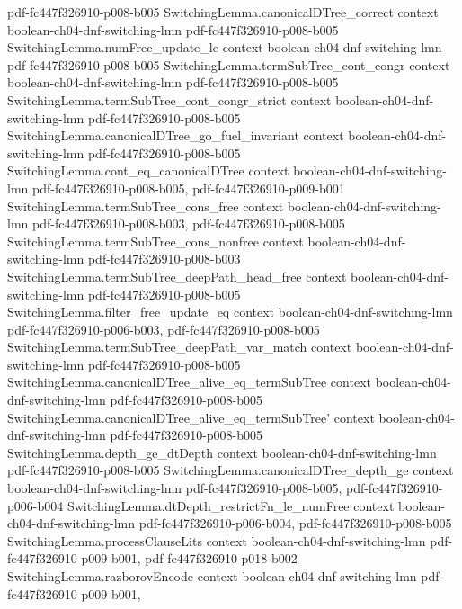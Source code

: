 \begin{lemma}
  {pdf-fc447f326910-p008-b005}
\proofstep
  {SwitchingLemma.canonicalDTree_correct}
  {context}
  {boolean-ch04-dnf-switching-lmn}
  {pdf-fc447f326910-p008-b005}
\proofstep
  {SwitchingLemma.numFree_update_le}
  {context}
  {boolean-ch04-dnf-switching-lmn}
  {pdf-fc447f326910-p008-b005}
\proofstep
  {SwitchingLemma.termSubTree_cont_congr}
  {context}
  {boolean-ch04-dnf-switching-lmn}
  {pdf-fc447f326910-p008-b005}
\proofstep
  {SwitchingLemma.termSubTree_cont_congr_strict}
  {context}
  {boolean-ch04-dnf-switching-lmn}
  {pdf-fc447f326910-p008-b005}
\proofstep
  {SwitchingLemma.canonicalDTree_go_fuel_invariant}
  {context}
  {boolean-ch04-dnf-switching-lmn}
  {pdf-fc447f326910-p008-b005}
\proofstep
  {SwitchingLemma.cont_eq_canonicalDTree}
  {context}
  {boolean-ch04-dnf-switching-lmn}
  {pdf-fc447f326910-p008-b005,
    pdf-fc447f326910-p009-b001}
\proofstep
  {SwitchingLemma.termSubTree_cons_free}
  {context}
  {boolean-ch04-dnf-switching-lmn}
  {pdf-fc447f326910-p008-b003,
    pdf-fc447f326910-p008-b005}
\proofstep
  {SwitchingLemma.termSubTree_cons_nonfree}
  {context}
  {boolean-ch04-dnf-switching-lmn}
  {pdf-fc447f326910-p008-b003}
\proofstep
  {SwitchingLemma.termSubTree_deepPath_head_free}
  {context}
  {boolean-ch04-dnf-switching-lmn}
  {pdf-fc447f326910-p008-b005}
\proofstep
  {SwitchingLemma.filter_free_update_eq}
  {context}
  {boolean-ch04-dnf-switching-lmn}
  {pdf-fc447f326910-p006-b003,
    pdf-fc447f326910-p008-b005}
\proofstep
  {SwitchingLemma.termSubTree_deepPath_var_match}
  {context}
  {boolean-ch04-dnf-switching-lmn}
  {pdf-fc447f326910-p008-b005}
\proofstep
  {SwitchingLemma.canonicalDTree_alive_eq_termSubTree}
  {context}
  {boolean-ch04-dnf-switching-lmn}
  {pdf-fc447f326910-p008-b005}
\proofstep
  {SwitchingLemma.canonicalDTree_alive_eq_termSubTree'}
  {context}
  {boolean-ch04-dnf-switching-lmn}
  {pdf-fc447f326910-p008-b005}
\proofstep
  {SwitchingLemma.depth_ge_dtDepth}
  {context}
  {boolean-ch04-dnf-switching-lmn}
  {pdf-fc447f326910-p008-b005}
\proofstep
  {SwitchingLemma.canonicalDTree_depth_ge}
  {context}
  {boolean-ch04-dnf-switching-lmn}
  {pdf-fc447f326910-p008-b005,
    pdf-fc447f326910-p006-b004}
\proofstep
  {SwitchingLemma.dtDepth_restrictFn_le_numFree}
  {context}
  {boolean-ch04-dnf-switching-lmn}
  {pdf-fc447f326910-p006-b004,
    pdf-fc447f326910-p008-b005}
\proofstep
  {SwitchingLemma.processClauseLits}
  {context}
  {boolean-ch04-dnf-switching-lmn}
  {pdf-fc447f326910-p009-b001,
    pdf-fc447f326910-p018-b002}
\proofstep
  {SwitchingLemma.razborovEncode}
  {context}
  {boolean-ch04-dnf-switching-lmn}
  {pdf-fc447f326910-p009-b001,
}
\end{lemma}
